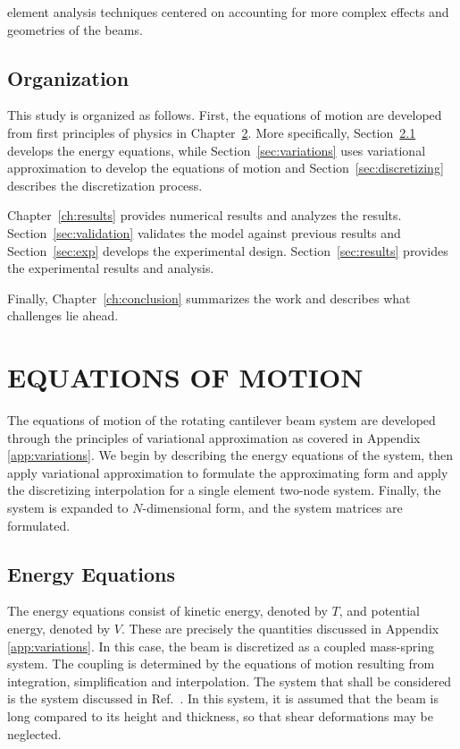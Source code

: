 element analysis techniques centered on accounting for more complex effects and geometries of the beams.

\section{Organization}
This study is organized as follows. First, the equations of motion are developed from first principles of physics in Chapter~\ref{chap:eom}. More specifically, Section~\ref{sec:energy_eqns} develops the energy equations, while Section~\ref{sec:variations} uses variational approximation to develop the equations of motion and Section~\ref{sec:discretizing} describes the discretization process.

Chapter~\ref{ch:results} provides numerical results and analyzes the results. Section~\ref{sec:validation} validates the model against previous results and Section~\ref{sec:exp} develops the experimental design. Section~\ref{sec:results} provides the experimental results and analysis.

Finally, Chapter~\ref{ch:conclusion} summarizes the work and describes what challenges lie ahead.

\chapter{EQUATIONS OF MOTION}
\label{chap:eom}
The equations of motion of the rotating cantilever beam system are developed through the principles of variational approximation as covered in Appendix \ref{app:variations}. We begin by describing the energy equations of the system, then apply variational approximation to formulate the approximating form and apply the discretizing interpolation for a single element two-node system. Finally, the system is expanded to $N$-dimensional form, and the system matrices are formulated. 

\section{Energy Equations}
\label{sec:energy_eqns}
The energy equations consist of kinetic energy, denoted by $T$, and potential energy, denoted by $V$. These are precisely the quantities discussed in Appendix \ref{app:variations}. In this case, the beam is discretized as a coupled mass-spring system. The coupling is determined by the equations of motion resulting from integration, simplification and interpolation. The system that shall be considered is the system discussed in Ref.~\cite{chung2002dynamic}. In this system, it is assumed that the beam is long compared to its height and thickness, so that shear deformations may be neglected. 

